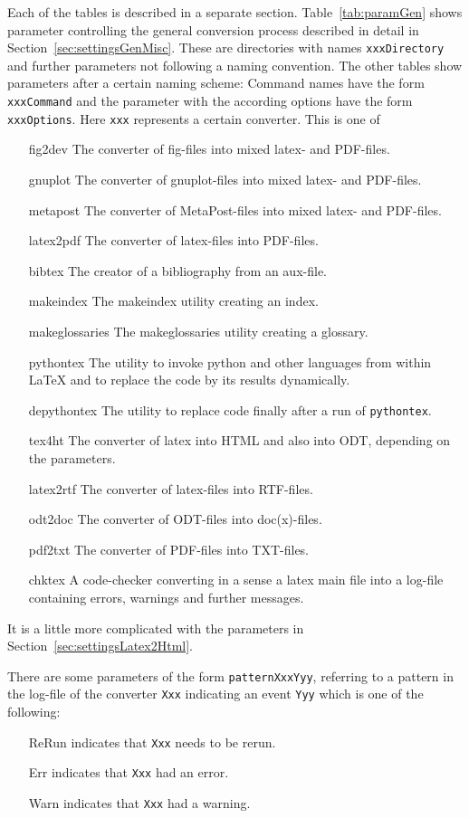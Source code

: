Each of the tables is described in a separate section. 
Table~\ref{tab:paramGen} 
shows parameter controlling the general conversion process 
described in detail in Section~\ref{sec:settingsGenMisc}. 
These are directories with names \texttt{xxxDirectory} 
and further parameters not following a naming convention. 
The other tables show parameters after a certain naming scheme: 
Command names have the form \texttt{xxxCommand} 
and the parameter with the according options have the form \texttt{xxxOptions}. 
Here \texttt{xxx} represents a certain converter. 
This is one of 
%
\begin{itemize}
\item[fig2dev]
The converter of fig-files into mixed latex- and PDF-files. 
\item[gnuplot]
The converter of gnuplot-files into mixed latex- and PDF-files. 
\item[metapost]
The converter of MetaPost-files into mixed latex- and PDF-files.
\item[latex2pdf]
The converter of latex-files into PDF-files. 
\item[bibtex]
The creator of a bibliography from an aux-file.
\item[makeindex]
The makeindex utility creating an index. 
\item[makeglossaries]
The makeglossaries utility creating a glossary. 
\item[pythontex]
The utility to invoke python and other languages from within \LaTeX{} 
and to replace the code by its results dynamically. 
\item[depythontex]
The utility to replace code finally after a run of \texttt{pythontex}. 
\item[tex4ht]
The converter of latex into HTML and also into ODT, 
depending on the parameters. 
\item[latex2rtf]
The converter of latex-files into RTF-files. 
\item[odt2doc]
The converter of ODT-files into doc(x)-files. %
\item[pdf2txt]
The converter of PDF-files into TXT-files. 
\item[chktex]
A code-checker converting in a sense a latex main file into a log-file 
containing errors, warnings and further messages. 
\end{itemize}

It is a little more complicated 
with the parameters in Section~\ref{sec:settingsLatex2Html}. 

There are some parameters of the form \texttt{patternXxxYyy}, 
referring to a pattern in the log-file of the converter \texttt{Xxx} 
indicating an event \texttt{Yyy} which is one of the following: 
%
\begin{itemize}
\item[ReRun]
indicates that \texttt{Xxx} needs to be rerun.
\item[Err]
indicates that \texttt{Xxx} had an error. 
\item[Warn]
indicates that \texttt{Xxx} had a warning. 
\end{itemize}


